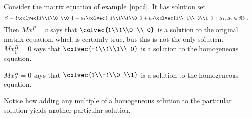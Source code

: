 \begin{example}
Consider the matrix equation of example~\ref{npcd}. It has  solution set
\[S = \left\{\colvec{1\\1\\0 \\0 } + \mu_1 \colvec{-1\\1\\1\\0 } + \mu_2 \colvec{1\\-1\\ 0\\1 } \, :\,  \mu_1,\mu_2 \in \Re \right\} \, .\]
Then $Mx^P =v$ says that 
$\colvec{1\\1\\0 \\ 0}$ is a solution to the original matrix equation, which is certainly true, but this is not the only solution.\\

$Mx^H _1=0$ says that $\colvec{-1\\1\\1\\ 0}$ is a solution to the homogeneous equation.

\vspace{2mm}

$Mx^H _2=0$ says that 
$\colvec{1\\-1\\0 \\1}$ is a solution to the homogeneous equation.

\vspace{2mm}

\noindent
Notice how adding any multiple of a homogeneous solution to the particular solution yields another particular solution.
\end{example}





%


